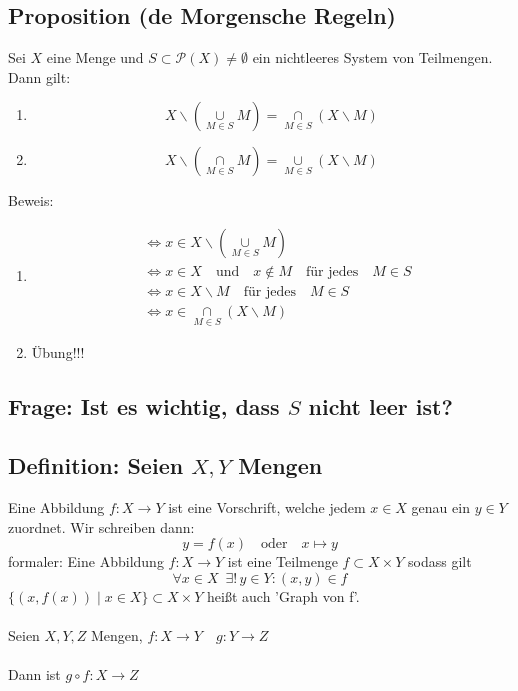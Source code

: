 \subsection{Proposition (de Morgensche Regeln)}
Sei \(X\) eine Menge und \( S \subset \mathcal{P} (X)\not= \emptyset \) ein nichtleeres System von Teilmengen.
Dann gilt:
\begin{enumerate}
\item \[ X \backslash ( \underset{M\in S}{\cup } M ) = \underset{M \in S}{\cap}(X \backslash M) \]
\item \[ X \backslash ( \underset{M \in S}{\cap} M) = \underset{M \in S}{\cup}(X \backslash M) \]
\end{enumerate}
Beweis: 
\begin{enumerate}
\item 
\begin{align*}
&\Leftrightarrow x \in X \backslash (\underset{M \in S}{\cup} M)\\ 
&\Leftrightarrow x \in  X \quad \mbox{und} \quad x \not\in M \quad \mbox{für jedes} \quad M \in S \\
&\Leftrightarrow x \in X \backslash M \quad \text{für jedes} \quad M \in S \\
&\Leftrightarrow x \in \underset{M \in S}{\cap} (X \backslash M)
\end{align*}

\item Übung!!!
\end{enumerate}

\subsection{Frage: Ist es wichtig, dass $S$ nicht leer ist?}

\subsection{Definition: Seien $X,Y$ Mengen}
Eine Abbildung \(f: X \rightarrow Y \) ist eine Vorschrift, welche jedem \(x \in X\) genau ein \(y \in Y\) zuordnet. Wir schreiben dann:
\[ y=f(x) \quad\text{oder} \quad x \mapsto y \]
formaler: Eine Abbildung \(f: X \rightarrow Y \) ist eine Teilmenge \(f \subset X \times Y \) sodass gilt \[ \forall x \in X \enspace \exists ! \,  y \in Y : (x,y) \in f\]
\( \{ (x, f(x) )\mid x \in X \} \subset X \times Y \) heißt auch 'Graph von f'. \\
\\
Seien \( X, Y, Z \) Mengen, \(f : X \rightarrow Y \quad g : Y \rightarrow Z \) \\
\\
Dann ist \( g \circ f : X\rightarrow Z \)


